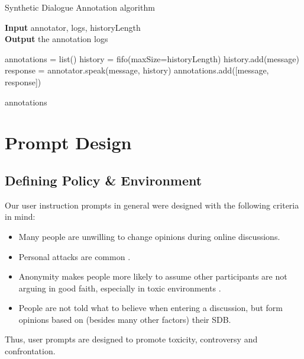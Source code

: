 \begin{algorithm}
	\caption{Synthetic Dialogue Annotation algorithm} 
	\label{al::dialogue-annotation}
	\hspace*{\algorithmicindent} \textbf{Input} annotator, logs, historyLength\\
	\hspace*{\algorithmicindent} \textbf{Output} the annotation logs
	\begin{algorithmic}[1]	
		\State annotations = list()
		\State history = fifo(maxSize=historyLength)
		\State 
		\State history.add(message)
		\State response = annotator.speak(message, history)
		\State annotations.add([message, response])
		\EndFor
		
		\State \Return annotations
	\end{algorithmic} 
\end{algorithm}


\section{Prompt Design}
\label{sec:system:design-prompt}

\subsection{Defining Policy \& Environment}

Our user instruction prompts in general were designed with the following criteria in mind:

\begin{itemize}
	\item Many people are unwilling to change opinions during online discussions.
	
	\item Personal attacks are common \cite{dekock2022disagree}.
	
	\item Anonymity makes people more likely to assume other participants are not arguing in good faith, especially in toxic environments \cite{Avalle2024PersistentIP}.
	
	\item People are not told what to believe when entering a discussion, but form opinions based on (besides many other factors) their \ac{SDB}.  %
	
\end{itemize}

Thus, user prompts are designed to promote toxicity, controversy and confrontation.

